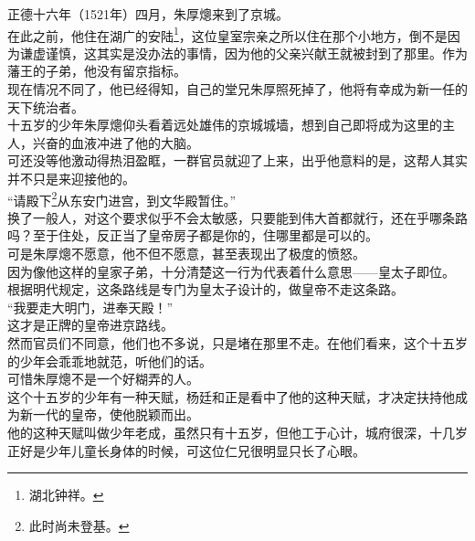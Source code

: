 	\begin{multicols}{\theparacolNo}
\fi
正德十六年（1521年）四月，朱厚熜来到了京城。\\

在此之前，他住在湖广的安陆\footnote{湖北钟祥。}，这位皇室宗亲之所以住在那个小地方，倒不是因为谦虚谨慎，这其实是没办法的事情，因为他的父亲兴献王就被封到了那里。作为藩王的子弟，他没有留京指标。\\

现在情况不同了，他已经得知，自己的堂兄朱厚照死掉了，他将有幸成为新一任的天下统治者。\\

十五岁的少年朱厚熜仰头看着远处雄伟的京城城墙，想到自己即将成为这里的主人，兴奋的血液冲进了他的大脑。\\

可还没等他激动得热泪盈眶，一群官员就迎了上来，出乎他意料的是，这帮人其实并不只是来迎接他的。\\

“请殿下\footnote{此时尚未登基。}从东安门进宫，到文华殿暂住。”\\

换了一般人，对这个要求似乎不会太敏感，只要能到伟大首都就行，还在乎哪条路吗？至于住处，反正当了皇帝房子都是你的，住哪里都是可以的。\\

可是朱厚熜不愿意，他不但不愿意，甚至表现出了极度的愤怒。\\

因为像他这样的皇家子弟，十分清楚这一行为代表着什么意思——皇太子即位。\\

根据明代规定，这条路线是专门为皇太子设计的，做皇帝不走这条路。\\

“我要走大明门，进奉天殿！”\\

这才是正牌的皇帝进京路线。\\

然而官员们不同意，他们也不多说，只是堵在那里不走。在他们看来，这个十五岁的少年会乖乖地就范，听他们的话。\\

可惜朱厚熜不是一个好糊弄的人。\\

这个十五岁的少年有一种天赋，杨廷和正是看中了他的这种天赋，才决定扶持他成为新一代的皇帝，使他脱颖而出。\\

他的这种天赋叫做少年老成，虽然只有十五岁，但他工于心计，城府很深，十几岁正好是少年儿童长身体的时候，可这位仁兄很明显只长了心眼。\\


\end{multicols}
